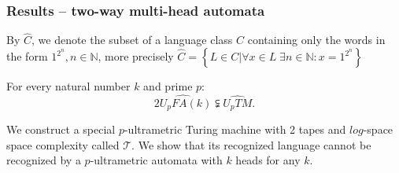 \documentclass{beamer}
\begin{document}
\begin{frame}
\frametitle{Results -- two-way multi-head automata}
By $\widehat{C}$, we denote the subset of a language class $C$ containing only the words in the form $1^{2^n}, n \in \mathbb{N}$, more precisely  
$\widehat{C} = \left\{ L \in C | \forall x \in L \; \exists n \in \mathbb{N} : x = 1^{2^n} \right\}$

\begin{theorem} \label{atdalisana}
For every natural number $k$ and prime $p$:
\[
	\widehat{2\mathit{U_pFA}(k)} \subsetneqq \widehat{U_pTM}.
\]
\end{theorem}
We construct a special $p$-ultrametric Turing machine with 2 tapes and $log$-space space complexity called $\mathcal{T}$. We show that its recognized language cannot be recognized by a $p$-ultrametric automata with $k$ heads for any $k$.

\end{frame}
\end{document}
